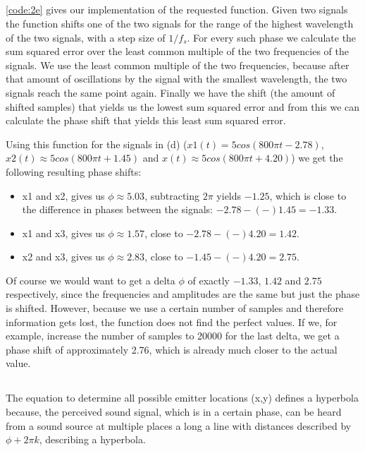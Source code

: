 \documentclass{article}
\begin{document}
\subsection{}
\autoref{code:2e} gives our implementation of the requested function. Given two signals the function shifts one of the two signals
for the range of the highest wavelength of the two signals, with a step size of $1/f_s$. For every such phase we calculate the sum squared error over the least common multiple of the two frequencies of the signals.
We use the least common multiple of the two frequencies, because after that amount of oscillations by the signal with the smallest
wavelength, the two signals reach the same point again. Finally we have the shift (the amount of shifted samples) that yields us the lowest sum squared error and
from this we can calculate the phase shift that yields this least sum squared error.

Using this function for the signals in (d) ($x1(t) = 5cos(800 \pi t - 2.78)$, $x2(t) \approx 5cos(800 \pi t + 1.45)$ and $x(t) \approx 5cos(800 \pi t + 4.20)$)
we get the following resulting phase shifts:
\begin{itemize}
 \item x1 and x2, gives us $\phi \approx 5.03$, subtracting $2\pi$ yields $-1.25$, which is close to the difference in phases between the signals: $-2.78 - (-) 1.45 = -1.33$.
 \item x1 and x3, gives us $\phi \approx 1.57$, close to $-2.78 - (-)4.20 = 1.42$.
 \item x2 and x3, gives us $\phi \approx 2.83$, close to $-1.45 - (-)4.20 = 2.75$.
\end{itemize}
Of course we would want to get a delta $\phi$ of exactly $-1.33$, $1.42$ and $2.75$ respectively, since the frequencies and amplitudes are the same
but just the phase is shifted. However, because we use a certain number of samples and therefore information gets lost,
the function does not find the perfect values. If we, for example, increase the number of samples to 20000 for the last delta, 
we get a phase shift of approximately 2.76, which is already much closer to the actual value.

\subsection{}
The equation to determine all possible emitter locations (x,y) defines a hyperbola because, the perceived sound signal, which is in a certain phase, can be heard from a sound source at multiple places a long a line with distances described by $\phi + 2\pi k$, describing a hyperbola. 
\end{document}
